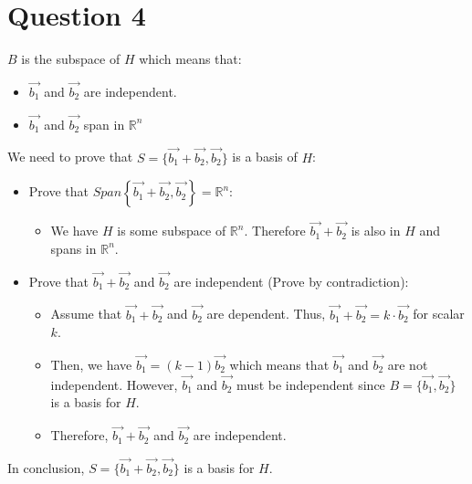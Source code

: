 \documentclass[10pt]{article}
\begin{document}
\section*{Question 4}
\noindent $B$ is the subspace of $H$ which means that:
\begin{itemize}
    \item $\Vec{b_1}$ and $\Vec{b_2}$ are independent.
    \item $\Vec{b_1}$ and $\Vec{b_2}$ span in $\mathbb{R}^n$
\end{itemize}

\noindent We need to prove that $S = \{\Vec{b_1}+ \Vec{b_2}, \Vec{b_2} \}$ is a basis of $H$:
\begin{itemize}
    \item \noindent Prove that $Span\left\{ \Vec{b_1}+ \Vec{b_2}, \Vec{b_2} \right\} = \mathbb{R}^n$:
    \begin{itemize}
        \item We have $H$ is some subspace of $\mathbb{R}^n$. Therefore $\Vec{b_1} + \Vec{b_2}$ is also in $H$ and spans in $\mathbb{R}^n$. \par
    \end{itemize}
    \item Prove that $\Vec{b_1}+ \Vec{b_2}$ and $\Vec{b_2}$ are independent (Prove by contradiction):
    \begin{itemize}
        \item Assume that $\Vec{b_1}+ \Vec{b_2}$ and $\Vec{b_2}$ are dependent. Thus, $\Vec{b_1}+ \Vec{b_2} = k \cdot \Vec{b_2}$ for scalar $k$.
        \item Then, we have $\Vec{b_1} = (k-1) \Vec{b_2}$ which means that $\Vec{b_1}$ and $\Vec{b_2}$ are not independent. However, $\Vec{b_1}$ and $\Vec{b_2}$ must be independent since $B = \{\Vec{b_1}, \Vec{b_2} \}$ is a basis for $H$.
        \item Therefore, $\Vec{b_1}+ \Vec{b_2}$ and $\Vec{b_2}$ are independent.
    \end{itemize}
\end{itemize}

\noindent In conclusion, $S = \{\Vec{b_1}+ \Vec{b_2}, \Vec{b_2} \}$ is a basis for $H$.

\end{document}
